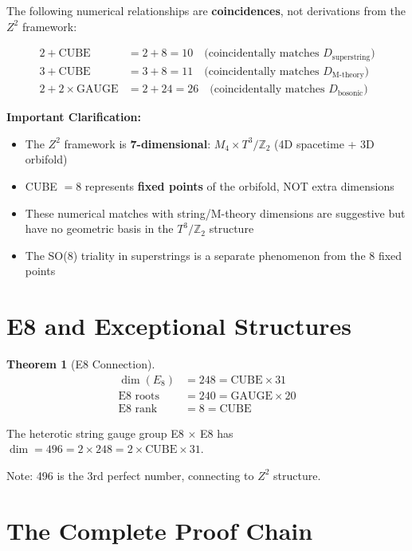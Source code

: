 \documentclass[11pt,a4paper]{article}
\theoremstyle{plain}
\newtheorem{theorem}{Theorem}[section]
\theoremstyle{definition}
\theoremstyle{remark}
\newcommand{\CUBE}{\text{CUBE}}
\newcommand{\GAUGE}{\text{GAUGE}}
\begin{document}
The following numerical relationships are \textbf{coincidences}, not derivations from the $Z^2$ framework:

\begin{align}
2 + \CUBE &= 2 + 8 = 10 \quad \text{(coincidentally matches } D_{\text{superstring}}\text{)} \\
3 + \CUBE &= 3 + 8 = 11 \quad \text{(coincidentally matches } D_{\text{M-theory}}\text{)} \\
2 + 2 \times \GAUGE &= 2 + 24 = 26 \quad \text{(coincidentally matches } D_{\text{bosonic}}\text{)}
\end{align}

\textbf{Important Clarification:}
\begin{itemize}
  \item The $Z^2$ framework is \textbf{7-dimensional}: $M_4 \times T^3/\mathbb{Z}_2$ (4D spacetime + 3D orbifold)
  \item CUBE $= 8$ represents \textbf{fixed points} of the orbifold, NOT extra dimensions
  \item These numerical matches with string/M-theory dimensions are suggestive but have no geometric basis in the $T^3/\mathbb{Z}_2$ structure
  \item The SO(8) triality in superstrings is a separate phenomenon from the 8 fixed points
\end{itemize}

\section{E8 and Exceptional Structures}

\begin{theorem}[E8 Connection]
\begin{align}
\dim(E_8) &= 248 = \CUBE \times 31 \\
\text{E8 roots} &= 240 = \GAUGE \times 20 \\
\text{E8 rank} &= 8 = \CUBE
\end{align}
\end{theorem}

The heterotic string gauge group E8 $\times$ E8 has $\dim = 496 = 2 \times 248 = 2 \times \CUBE \times 31$.

Note: 496 is the 3rd perfect number, connecting to $Z^2$ structure.

\section{The Complete Proof Chain}
\end{document}
